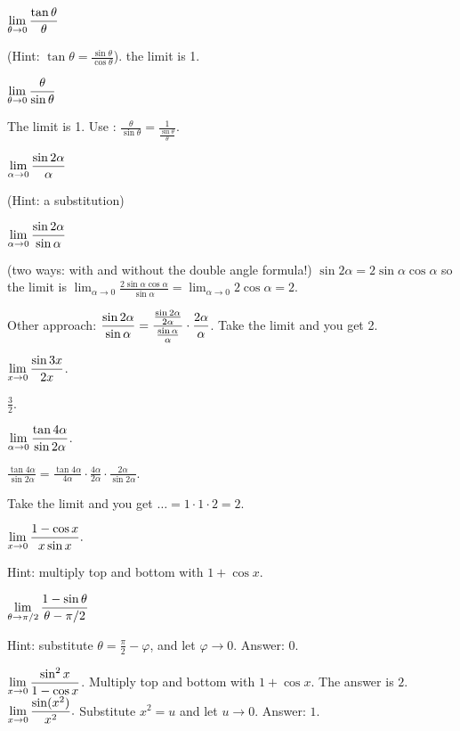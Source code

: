 \begin{multicols}{3}\setlength{\parindent}{0pt}
\problem $\displaystyle \lim_{\theta\to0} \frac{\tan \theta}{\theta}$ 

(Hint: $\tan\theta = \frac{\sin\theta}{\cos \theta}$).
\answer 
the limit is 1.
\endanswer

\problem $\displaystyle \lim_{\theta\to0} \frac{\theta}{\sin \theta}$ 

\answer 
The limit is 1.
Use :
$\frac{\theta}{\sin\theta} = \frac{1}{\frac{\sin\theta}{\theta}}$.
\endanswer

\problem $\displaystyle \lim_{\alpha\to0}\frac{\sin 2\alpha}{\alpha}$ 

(Hint: a substitution)

\problem $\displaystyle \lim_{\alpha\to0}\frac{\sin 2\alpha}{\sin\alpha}$ 

(two ways: with and without the double angle formula!)
\answer 
$\sin 2\alpha = 2\sin\alpha\cos\alpha$ so the limit is
$\lim_{\alpha\to0} \frac{2\sin\alpha\cos\alpha}{\sin\alpha} =
\lim_{\alpha\to0} 2\cos\alpha = 2$.

Other approach: $\displaystyle\frac{\sin2\alpha}{\sin\alpha} =
\frac{\frac{\sin2\alpha}{2\alpha}}{\frac{\sin\alpha}{\alpha}}\cdot
\frac{2\alpha}{\alpha}$. Take the limit and you get 2.
\endanswer

\problem $\displaystyle \lim_{x\to0}\frac{\sin 3x}{2x}$. 

\answer 
$\frac{3}{2}$.
\endanswer



\problem $\displaystyle \lim_{\alpha\to0}\frac{\tan 4\alpha}{\sin 2\alpha}$. 

\answer 
$\frac{\tan 4\alpha}{\sin 2\alpha}
= \frac{\tan 4\alpha}{4\alpha}\cdot
\frac{4\alpha}{2\alpha}\cdot \frac{2\alpha}{\sin2\alpha}$.

Take the limit and you get $\ldots = 1\cdot1\cdot2 = 2$.
\endanswer

\problem $\displaystyle \lim_{x\to 0} \frac{1-\cos x}{ x \sin x}.$ 

\answer 
Hint: multiply top and bottom with \(1+\cos x\).
\endanswer

\problem $\displaystyle\lim_{\theta\to\pi/2}\frac{1-\sin\theta}{\theta-\pi/2}$ 

\answer 
Hint: substitute $\theta = \frac{\pi}{2} - \varphi$, and let
$\varphi\to 0$.  Answer: $0$.
\endanswer

\problem $\displaystyle \lim_{x\to0}\frac{\sin^2 x}{1-\cos x}$. 
\answer 
Multiply top and bottom with $1+\cos x$.  The answer is $2$.
\endanswer
\problem $\displaystyle \lim_{x\to0}\frac{\sin(x^2)}{x^2}.$ 
\answer 
Substitute $x^2 = u$ and let $u\to 0$.  Answer: $1$.
\endanswer


\end{multicols}
